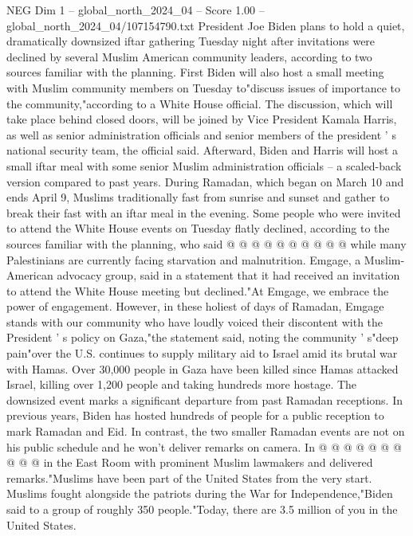 \begin{textsample}{NEG Dim 1 – global\_north\_2024\_04 – Score 1.00 – global\_north\_2024\_04/107154790.txt}  \label{ex:f1_neg_300}
President Joe Biden plans to hold a quiet, dramatically downsized iftar gathering Tuesday night after invitations were declined by several Muslim American community leaders, according to two sources familiar with the planning.
First Biden will also host a small meeting with Muslim community members on Tuesday to"discuss issues of importance to the community,"according to a White House official.
The discussion, which will take place behind closed doors, will be joined by Vice President Kamala Harris, as well as senior administration officials and senior members of the president ' s national security team, the official said.
Afterward, Biden and Harris will host a small iftar meal with some senior Muslim administration officials -- a scaled-back version compared to past years.
During Ramadan, which began on March 10 and ends April 9, Muslims traditionally fast from sunrise and sunset and gather to break their fast with an iftar meal in the evening.
Some people who were invited to attend the White House events on Tuesday flatly declined, according to the sources familiar with the planning, who said @ @ @ @ @ @ @ @ @ @ while many Palestinians are currently facing starvation and malnutrition.
Emgage, a Muslim-American advocacy group, said in a statement that it had received an invitation to attend the White House meeting but declined."At Emgage, we embrace the power of engagement.
However, in these holiest of days of Ramadan, Emgage stands with our community who have loudly voiced their discontent with the President ' s policy on Gaza,"the statement said, noting the community ' s"deep pain"over the U.S. continues to supply military aid to Israel amid its brutal war with Hamas.
Over 30,000 people in Gaza have been killed since Hamas attacked Israel, killing over 1,200 people and taking hundreds more hostage.
The downsized event marks a significant departure from past Ramadan receptions.
In previous years, Biden has hosted hundreds of people for a public reception to mark Ramadan and Eid.
In contrast, the two smaller Ramadan events are not on his public schedule and he won't deliver remarks on camera.
In @ @ @ @ @ @ @ @ @ @ in the East Room with prominent Muslim lawmakers and delivered remarks."Muslims have been part of the United States from the very start.
Muslims fought alongside the patriots during the War for Independence,"Biden said to a group of roughly 350 people."Today, there are 3.5 million of you in the United States.

\end{textsample}
